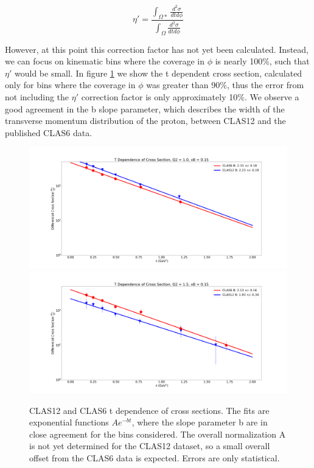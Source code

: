 \begin{equation}\label{eq:eta}
    \eta' = \frac{\int_{\Omega*} \frac{d^2\sigma}{dtd\phi} }{\int_{\Omega} \frac{d^2\sigma}{dtd\phi}}
\end{equation}

However, at this point this correction factor has not yet been calculated. Instead, we can focus on kinematic bins where the coverage in $\phi$ is nearly 100\%, such that $\eta'$ would be small. In figure \ref{fig:tdep} we show the t dependent cross section, calculated only for bins where the coverage in $\phi$ was greater than 90\%, thus the error from not including the $\eta'$ correction factor is only approximately 10\%. We observe a good agreement in the b slope parameter, which describes the width of the transverse momentum distribution of the proton, between CLAS12 and the published CLAS6 data.


\begin{figure}[hbt]
	\centering
	\includegraphics[page=125,width=0.45\linewidth]{Chapters/Ch5-FurtherAnalysis/tdep/fig_1.0_0.15.png}
	\includegraphics[page=130,width=0.45\linewidth]{Chapters/Ch5-FurtherAnalysis/tdep/fig_1.5_0.15.png}

	\caption{CLAS12 and CLAS6 t dependence of cross sections. The fits are exponential functions $Ae^{-bt}$, where the slope parameter b are in close agreement for the bins considered. The overall normalization A is not yet determined for the CLAS12 dataset, so a small overall offset from the CLAS6 data is expected. Errors are only statistical.}
	\label{fig:tdep}
\end{figure}
